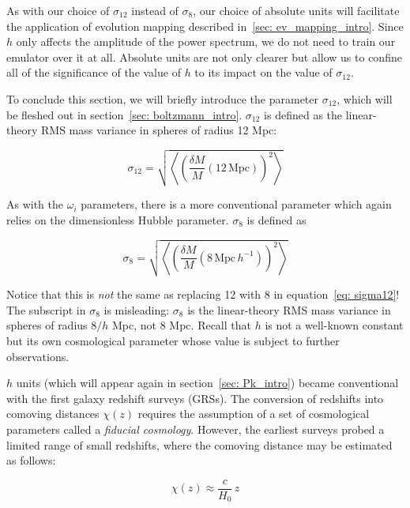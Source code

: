 As with our choice of $\sigma_{12}$ instead of $\sigma_8$, our choice of
absolute units will facilitate the application of evolution mapping described
in~\ref{sec: ev_mapping_intro}. Since $h$ only affects the amplitude of the
power spectrum, we do not need to train our emulator over it at all. Absolute 
units are not only clearer but allow us to confine all of the significance of
the value of $h$ to its impact on the value of $\sigma_{12}$.


To conclude this section, we will briefly introduce the parameter
$\sigma_{12}$, which will be fleshed out in
section~\ref{sec: boltzmann_intro}. 
$\sigma_{12}$ is defined as the linear-theory RMS mass variance in spheres
of radius 12 Mpc:

\begin{equation}
\label{eq: sigma12}
\sigma_{12}
=
\sqrt{\left\langle \left(
	\frac{\delta M}{M} (12 \, \mathrm{Mpc})
\right)^2 \right\rangle}
\end{equation}

As with the $\omega_i$ parameters, there is a more conventional parameter
which again relies on the dimensionless Hubble parameter. $\sigma_8$ is
defined as

\begin{equation}
\sigma_8
=
\sqrt{\left\langle \left(
	\frac{\delta M}{M} (8 \, \mathrm{Mpc} \, h^{-1})
\right)^2 \right\rangle}
\end{equation}

Notice that this is \textit{not} the same as replacing 12 with 8 in
equation~\ref{eq: sigma12}! The subscript in $\sigma_8$ is misleading:
$\sigma_8$ is the linear-theory RMS mass variance in spheres of radius
$8 / h$ Mpc, not 8 Mpc. Recall that $h$ is not a well-known constant but its 
own  cosmological parameter whose value is subject to further observations.

$h$ units (which will appear again in section~\ref{sec: Pk_intro}) became
conventional with the first galaxy redshift surveys (GRSs). The conversion of
redshifts into comoving distances $\chi(z)$ requires the assumption of a set 
of
cosmological parameters called a \textit{fiducial cosmology}. However, the
earliest surveys probed a limited range of small redshifts, where the
comoving distance may be estimated as follows:

\begin{equation}
\label{eq: comov_dist_approx}
\chi(z) \approx \frac{c}{H_0} \, z
\end{equation}

